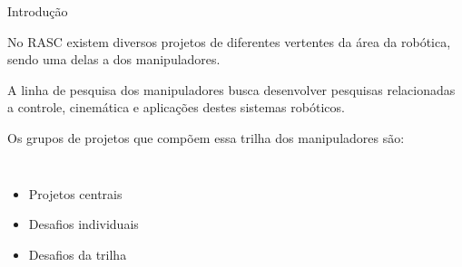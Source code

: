 \begin{frame}[t]{Introdução} 

    No RASC existem diversos projetos de diferentes vertentes da área da robótica, sendo uma delas a dos manipuladores.

    \vspace*{0.3cm}

    A linha de pesquisa dos manipuladores busca desenvolver pesquisas relacionadas a controle, cinemática e aplicações destes sistemas robóticos.

    \vspace*{0.3cm}

    Os grupos de projetos que compõem essa trilha dos manipuladores são:
        \begin{columns}[t]
            \begin{itemize}
                \item Projetos centrais
                \item Desafios individuais
                \item Desafios da trilha
            \end{itemize}
            \begin{center}
                \begin{figure}
                \end{figure}
            \end{center}
        \end{columns}
\end{frame}
\begin{frame}[c]{} 
   
    \begin{center}
    \end{center}
       
\end{frame}
